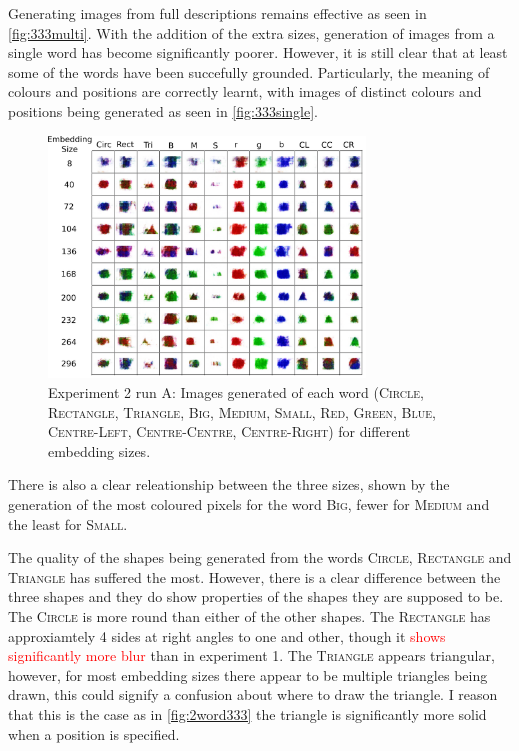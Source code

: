 Generating images from full descriptions remains effective as seen in \autoref{fig:333multi}.
With the addition of the extra sizes, generation of images from a single word has become significantly poorer. However, it is still clear that at least some of the words have been succefully grounded. Particularly, the meaning of colours and positions are correctly learnt, with images of distinct colours and positions being generated as seen in \autoref{fig:333single}. 

\begin{figure}[h]
\centering
\includegraphics[width=0.75\textwidth]{Figs/shapes/singlelabel333A.png}
\caption{Experiment 2 run A: Images generated of each word (\textsc{Circle, Rectangle, Triangle, Big, Medium, Small, Red, Green, Blue, Centre-Left, Centre-Centre, Centre-Right}) for different embedding sizes.}
\label{fig:333single}
\end{figure} 

There is also a clear releationship between the three sizes, shown by the generation of the most coloured pixels for the word \textsc{Big}, fewer for \textsc{Medium} and the least for \textsc{Small}.


The quality of the shapes being generated from the words \textsc{Circle}, \textsc{Rectangle} and \textsc{Triangle} has suffered the most. However, there is a clear difference between the three shapes and they do show properties of the shapes they are supposed to be. The \textsc{Circle} is more round than either of the other shapes. The \textsc{Rectangle} has approxiamtely 4 sides at right angles to one and other, though it \textcolor{red}{shows significantly more blur} than in experiment 1. The \textsc{Triangle} appears triangular, however, for most embedding sizes there appear to be multiple triangles being drawn, this could signify a confusion about where to draw the triangle. I reason that this is the case as in \autoref{fig:2word333} the triangle is significantly more solid when a position is specified. 


